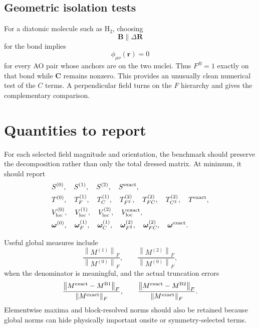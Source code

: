 \documentclass[11pt]{article}
\newcommand{\vect}[1]{\bm{#1}}
\newcommand{\norm}[1]{\left\lVert #1\right\rVert}
\begin{document}
\subsection{Geometric isolation tests}
For a diatomic molecule such as H$_2$, choosing
\begin{equation}
\vect B\parallel\Delta\vect R
\end{equation}
for the bond implies
\begin{equation}
\phi_{\mu\nu}(\vect r)=0
\end{equation}
for every AO pair whose anchors are on the two nuclei.  Thus $F^B=1$ exactly on that bond while $\vect C$ remains nonzero.  This provides an unusually clean numerical test of the $C$ terms.  A perpendicular field turns on the $F$ hierarchy and gives the complementary comparison.

\section{Quantities to report}

For each selected field magnitude and orientation, the benchmark should preserve the decomposition rather than only the total dressed matrix.  At minimum, it should report
\begin{align}
&S^{(0)},\quad S^{(1)},\quad S^{(2)},\quad S^{\rm exact},\\
&T^{(0)},\quad T_F^{(1)},\quad T_C^{(1)},\quad
T_{F^2}^{(2)},\quad T_{FC}^{(2)},\quad T_{C^2}^{(2)},\quad T^{\rm exact},\\
&V_{\rm loc}^{(0)},\quad V_{\rm loc}^{(1)},\quad
V_{\rm loc}^{(2)},\quad V_{\rm loc}^{\rm exact},\\
&\vect\omega^{(0)},\quad \vect\omega_F^{(1)},\quad
\vect\omega_C^{(1)},\quad
\vect\omega_{F^2}^{(2)},\quad
\vect\omega_{FC}^{(2)},\quad
\vect\omega^{\rm exact}.
\end{align}

Useful global measures include
\begin{equation}
\frac{\norm{M^{(1)}}_F}{\norm{M^{(0)}}_F},
\qquad
\frac{\norm{M^{(2)}}_F}{\norm{M^{(0)}}_F},
\end{equation}
when the denominator is meaningful, and the actual truncation errors
\begin{equation}
\frac{\norm{M^{\rm exact}-M^{\rm B1}}_F}{\norm{M^{\rm exact}}_F},
\qquad
\frac{\norm{M^{\rm exact}-M^{\rm B2}}_F}{\norm{M^{\rm exact}}_F}.
\end{equation}
Elementwise maxima and block-resolved norms should also be retained because global norms can hide physically important onsite or symmetry-selected terms.
\end{document}
